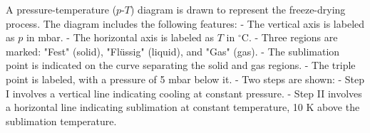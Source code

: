 A pressure-temperature (\(p\)-\(T\)) diagram is drawn to represent the freeze-drying process. The diagram includes the following features:  
- The vertical axis is labeled as \(p\) in mbar.  
- The horizontal axis is labeled as \(T\) in \(^\circ\text{C}\).  
- Three regions are marked: "Fest" (solid), "Flüssig" (liquid), and "Gas" (gas).  
- The sublimation point is indicated on the curve separating the solid and gas regions.  
- The triple point is labeled, with a pressure of 5 mbar below it.  
- Two steps are shown:  
  - Step I involves a vertical line indicating cooling at constant pressure.  
  - Step II involves a horizontal line indicating sublimation at constant temperature, 10 K above the sublimation temperature.